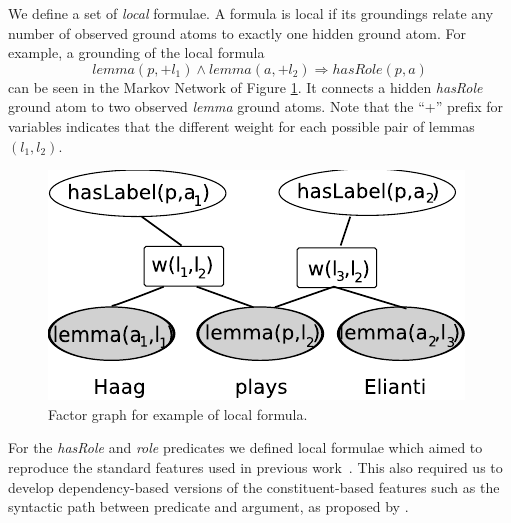 


We define a set of \emph{local} formulae. A formula is local if its groundings relate any number of observed ground atoms to exactly one hidden ground atom. For example, a grounding of the local formula 
\[lemma(p,+l_1) \wedge lemma(a,+l_2) \Rightarrow hasRole(p,a)\]
can be seen in the Markov Network of Figure \ref{fig:local2}. It connects a hidden \emph{hasRole} ground atom to two observed \emph{lemma} ground atoms. Note that the ``+'' prefix for variables indicates that the different weight for each possible pair of lemmas $(l_1,l_2)$.


\begin{figure}
\begin{center}
    \includegraphics[scale=.70]{LocalFormula2}
\end{center}
\caption{Factor graph for example of local formula.}
\label{fig:local2}
\end{figure}

For the \emph{hasRole} and \emph{role} predicates we defined local formulae which aimed to reproduce the standard features used in previous work~\citep{xue04calibrating}. This also required us to develop dependency-based versions of the constituent-based features such as the syntactic path between predicate and argument, as proposed by \cite{xue04calibrating}. 

